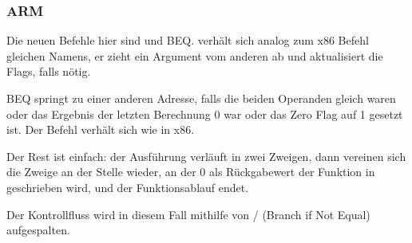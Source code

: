 \subsubsection{ARM}




Die neuen Befehle hier sind \CMP und \ac{BEQ}.
\CMP verhält sich analog zum x86 Befehl gleichen Namens, er zieht ein Argument vom anderen ab und aktualisiert die
Flags, falls nötig.

\ac{BEQ} springt zu einer anderen Adresse, falls die beiden Operanden gleich waren oder das Ergebnis der letzten
Berechnung 0 war oder das Zero Flag auf 1 gesetzt ist. Der Befehl verhält sich wie \JZ in x86.

Der Rest ist einfach: der Ausführung verläuft in zwei Zweigen, dann vereinen sich die Zweige an der Stelle wieder, an
der 0 als Rückgabewert der Funktion in  geschrieben wird, und der Funktionsablauf endet. 




Der Kontrollfluss wird in diesem Fall mithilfe von / (Branch if Not Equal) aufgespalten.

